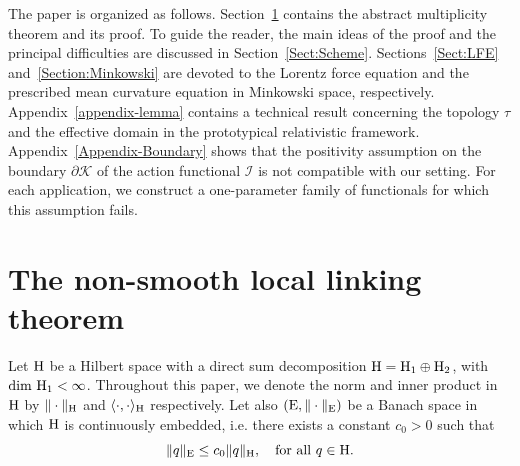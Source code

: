 \documentclass{article}
\newcommand{\boK}{\mathcal{K}}
\newcommand{\boI}{\mathcal{I}}
\newcommand{\Hilb}{{\textnormal H}}
\newcommand{\Ebanach}{{\textnormal E}}
\theoremstyle{definition}
\begin{document}
The paper is organized as follows. Section~\ref{Sect:FunctionalFramework} contains the abstract multiplicity theorem and its proof. To guide the reader, the main ideas of the proof and the principal difficulties are discussed in Section~\ref{Sect:Scheme}. Sections~\ref{Sect:LFE} and~\ref{Section:Minkowski} are devoted to the Lorentz force equation and the prescribed mean curvature equation in Minkowski space, respectively. Appendix~\ref{appendix-lemma} contains a technical result concerning the topology $\tau$ and the effective domain in the prototypical relativistic framework. Appendix~\ref{Appendix-Boundary} shows that the positivity assumption on the boundary $\partial\boK$ of the action functional $\boI$ is not compatible with our setting. For each application, we construct a one-parameter family of functionals for which this assumption fails.


\section{The non-smooth local linking theorem }\label{Sect:FunctionalFramework}
Let $\Hilb$ be a Hilbert space with a direct sum decomposition $\Hilb=\Hilb_1\oplus\Hilb_2$, with $\text{dim } \Hilb_1<\infty$. 
Throughout this paper, we denote the norm and inner product in $\Hilb$ by $\|\cdot\|_\Hilb$ and $\langle\cdot,\cdot\rangle_\Hilb$ respectively. Let also $(\Ebanach,\|\cdot\|_\Ebanach)$ be a Banach space in which $\Hilb$ is continuously embedded, i.e. there exists a constant $c_0>0$ such that  
    \begin{equation}\label{eq:embedding}
\|q\|_{\textnormal E}\leq c_0 \|q\|_\Hilb,\quad\hbox{for all }q\in\Hilb.
\end{equation}
   
\end{document}
